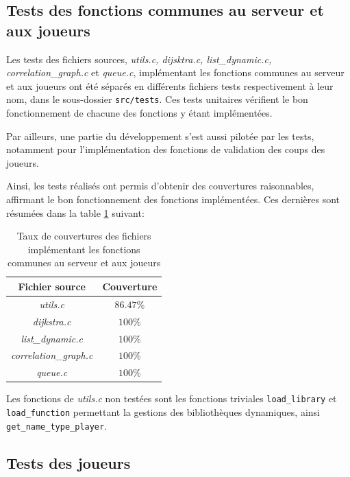 \documentclass[11pt]{article}
\begin{document}
\subsection{Tests des fonctions communes au serveur et aux joueurs}

Les tests des fichiers sources, \textit{utils.c, dijsktra.c, list\_dynamic.c, correlation\_graph.c} et \textit{queue.c}, implémentant les fonctions communes au serveur et aux joueurs ont été séparés en différents fichiers tests respectivement à leur nom, dans le sous-dossier \texttt{src/tests}. Ces tests unitaires vérifient le bon fonctionnement de chacune des fonctions y étant implémentées.

Par ailleurs, une partie du développement s'est aussi pilotée par les tests, notamment pour l'implémentation des fonctions de validation des coups des joueurs.

Ainsi, les tests réalisés ont permis d'obtenir des couvertures raisonnables, affirmant le bon fonctionnement des fonctions implémentées. Ces dernières sont résumées dans la table \ref{tab:coverage} suivant:

\begin{table}[H]
\begin{center}
\begin{tabular}{|c|c|}
\hline
Fichier source  & Couverture  \\ 

\hline

\textit{utils.c}         & $86.47$\% \\
\textit{dijkstra.c}      & $100$\% \\
\textit{list\_dynamic.c} & $100$\% \\ 
\textit{correlation\_graph.c} & $100$\% \\
\textit{queue.c} & $100$\% \\

\hline
\end{tabular}
\end{center}
\caption{\label{tab:coverage}Taux de couvertures des fichiers implémentant les fonctions communes au serveur et aux joueurs}
\end{table}

Les fonctions de \textit{utils.c} non testées sont les fonctions triviales \texttt{load\_library} et \texttt{load\_function} permettant la gestions des bibliothèques dynamiques, ainsi \texttt{get\_name\_type\_player}.

\subsection{Tests des joueurs}
\end{document}
